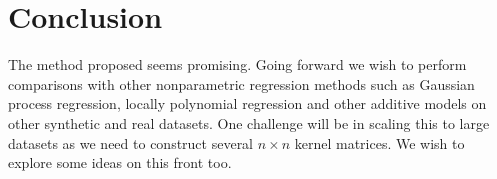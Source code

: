 
\section{Conclusion}
\label{sec:conclusion}

The method proposed seems promising.
Going forward we wish to perform comparisons with other nonparametric regression
methods such as Gaussian process regression, locally polynomial regression and
other additive models \citep{hastie90gam, ravikumar09spam,
duvenaud11additivegps} on other synthetic and real datasets.
One challenge will be in scaling this to large datasets as we need to construct
several $n\times n$ kernel matrices. We wish to explore some ideas on this front
too.


